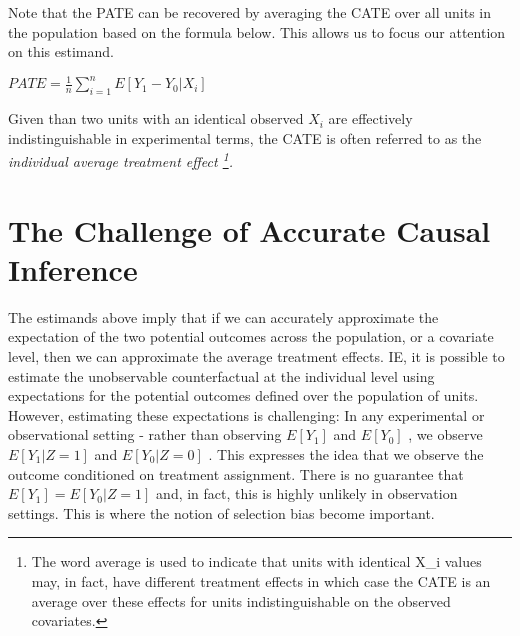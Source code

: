 \documentclass[../main.tex]{subfiles}
\begin{document}
\vspace{\baselineskip}
Note that the PATE can be recovered by averaging the CATE over all units in the population based on the formula below. This allows us to focus our attention on this estimand.\par


\vspace{\baselineskip}
\begin{adjustwidth}{0.5in}{0.0in}
 \( PATE = \frac{1}{n} \sum _{i=1}^{n}E \left[ Y_{1} - Y_{0}  \vert  X_{i} \right]  \) \par

\end{adjustwidth}


\vspace{\baselineskip}
Given than two units with an identical observed  \( X_{i} \) are effectively indistinguishable in experimental terms, the CATE is often referred to as the \textit{individual average treatment effect \footnote{ The word average is used to indicate that units with identical X\_i values may, in fact, have different treatment effects in which case the CATE is an average over these effects for units indistinguishable on the observed covariates. }.}\par

\section{The Challenge of Accurate Causal Inference}

\vspace{\baselineskip}
The estimands above imply that if we can accurately approximate the expectation of the two potential outcomes across the population, or a covariate level, then we can approximate the average treatment effects. IE, it is possible to estimate the unobservable counterfactual at the individual level using expectations for the potential outcomes defined over the population of units. However, estimating these expectations is challenging: In any experimental or observational setting - rather than observing  \( E \left[ Y_{1} \right]  \)  and  \( E \left[ Y_{0} \right]  \) , we observe  \( E \left[ Y_{1}  \vert  Z=1 \right]   \) and  \( E \left[ Y_{0}  \vert  Z= 0 \right]  \) . This expresses the idea that we observe the outcome conditioned on treatment assignment. There is no guarantee that  \( E \left[ Y_{1} \right]  = E \left[ Y_{0}  \vert  Z=1 \right]  \)  and, in fact, this is highly unlikely in observation settings. This is where the notion of selection bias become important.\par
\end{document}
